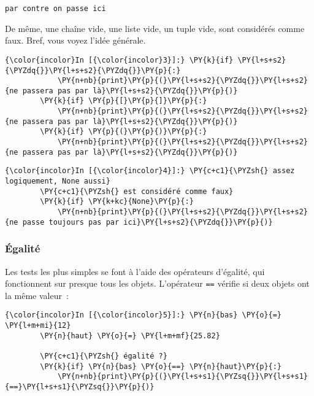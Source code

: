     \begin{Verbatim}[commandchars=\\\{\}]
par contre on passe ici

    \end{Verbatim}

    De même, une chaîne vide, une liste vide, un tuple vide, sont considérés
comme faux. Bref, vous voyez l'idée générale.

    \begin{Verbatim}[commandchars=\\\{\}]
{\color{incolor}In [{\color{incolor}3}]:} \PY{k}{if} \PY{l+s+s2}{\PYZdq{}}\PY{l+s+s2}{\PYZdq{}}\PY{p}{:} 
            \PY{n+nb}{print}\PY{p}{(}\PY{l+s+s2}{\PYZdq{}}\PY{l+s+s2}{ne passera pas par là}\PY{l+s+s2}{\PYZdq{}}\PY{p}{)}
        \PY{k}{if} \PY{p}{[}\PY{p}{]}\PY{p}{:} 
            \PY{n+nb}{print}\PY{p}{(}\PY{l+s+s2}{\PYZdq{}}\PY{l+s+s2}{ne passera pas par là}\PY{l+s+s2}{\PYZdq{}}\PY{p}{)}
        \PY{k}{if} \PY{p}{(}\PY{p}{)}\PY{p}{:}
            \PY{n+nb}{print}\PY{p}{(}\PY{l+s+s2}{\PYZdq{}}\PY{l+s+s2}{ne passera pas par là}\PY{l+s+s2}{\PYZdq{}}\PY{p}{)}
\end{Verbatim}


    \begin{Verbatim}[commandchars=\\\{\}]
{\color{incolor}In [{\color{incolor}4}]:} \PY{c+c1}{\PYZsh{} assez logiquement, None aussi}
        \PY{c+c1}{\PYZsh{} est considéré comme faux}
        \PY{k}{if} \PY{k+kc}{None}\PY{p}{:}
            \PY{n+nb}{print}\PY{p}{(}\PY{l+s+s2}{\PYZdq{}}\PY{l+s+s2}{ne passe toujours pas par ici}\PY{l+s+s2}{\PYZdq{}}\PY{p}{)}
\end{Verbatim}


    \hypertarget{uxe9galituxe9}{%
\subsubsection{Égalité}\label{uxe9galituxe9}}

    Les tests les plus simples se font à l'aide des opérateurs d'égalité,
qui fonctionnent sur presque tous les objets. L'opérateur \texttt{==}
vérifie si deux objets ont la même valeur~:

    \begin{Verbatim}[commandchars=\\\{\}]
{\color{incolor}In [{\color{incolor}5}]:} \PY{n}{bas} \PY{o}{=} \PY{l+m+mi}{12}
        \PY{n}{haut} \PY{o}{=} \PY{l+m+mf}{25.82}
        
        \PY{c+c1}{\PYZsh{} égalité ?}
        \PY{k}{if} \PY{n}{bas} \PY{o}{==} \PY{n}{haut}\PY{p}{:}
            \PY{n+nb}{print}\PY{p}{(}\PY{l+s+s1}{\PYZsq{}}\PY{l+s+s1}{==}\PY{l+s+s1}{\PYZsq{}}\PY{p}{)}
\end{Verbatim}


